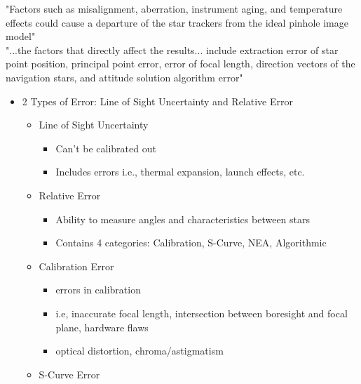"Factors such as misalignment, aberration, instrument aging, and temperature effects could cause a departure of the star trackers from the ideal pinhole image model"\cite{optical_system_error_analysis_and_calibration}\\
"...the factors that directly affect the results... include extraction error of star point position, principal point error, error of focal length, direction vectors of the navigation stars, and attitude solution algorithm error" \cite{optical_system_error_analysis_and_calibration} \\

\begin{itemize}
    \item 2 Types of Error: Line of Sight Uncertainty and Relative Error
    \begin{itemize}
        \item Line of Sight Uncertainty
        \begin{itemize}
            \item Can't be calibrated out
            \item Includes errors i.e., thermal expansion, launch effects, etc.
        \end{itemize}
    \end{itemize}
    \begin{itemize}
        \item Relative Error
        \begin{itemize}
            \item Ability to measure angles and characteristics between stars 
            \item Contains 4 categories: Calibration, S-Curve, NEA, Algorithmic
        \end{itemize}
    \end{itemize}
    \begin{itemize}
        \item Calibration Error
        \begin{itemize}
            \item errors in calibration
            \item i.e, inaccurate focal length, intersection between boresight and focal plane, hardware flaws
            \item optical distortion, chroma/astigmatism
        \end{itemize}
    \end{itemize}
    \begin{itemize}
        \item S-Curve Error

\end{itemize}
\end{itemize}
